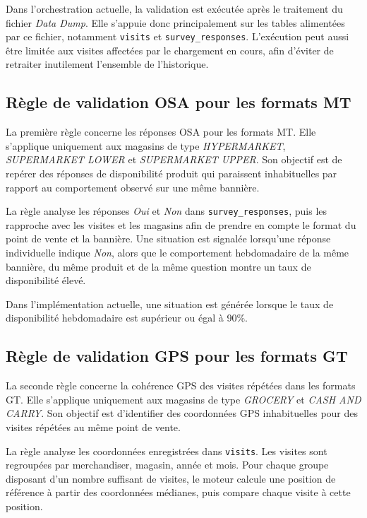 Dans l’orchestration actuelle, la validation est exécutée après le traitement du fichier \textit{Data Dump}. Elle s’appuie donc principalement sur les tables alimentées par ce fichier, notamment \texttt{visits} et \texttt{survey\_responses}. L’exécution peut aussi être limitée aux visites affectées par le chargement en cours, afin d’éviter de retraiter inutilement l’ensemble de l’historique.

\subsection{Règle de validation OSA pour les formats MT}

La première règle concerne les réponses OSA pour les formats MT. Elle s’applique uniquement aux magasins de type \textit{HYPERMARKET}, \textit{SUPERMARKET LOWER} et \textit{SUPERMARKET UPPER}. Son objectif est de repérer des réponses de disponibilité produit qui paraissent inhabituelles par rapport au comportement observé sur une même bannière.

La règle analyse les réponses \textit{Oui} et \textit{Non} dans \texttt{survey\_responses}, puis les rapproche avec les visites et les magasins afin de prendre en compte le format du point de vente et la bannière. Une situation est signalée lorsqu’une réponse individuelle indique \textit{Non}, alors que le comportement hebdomadaire de la même bannière, du même produit et de la même question montre un taux de disponibilité élevé.

Dans l’implémentation actuelle, une situation est générée lorsque le taux de disponibilité hebdomadaire est supérieur ou égal à 90\%.

\subsection{Règle de validation GPS pour les formats GT}

La seconde règle concerne la cohérence GPS des visites répétées dans les formats GT. Elle s’applique uniquement aux magasins de type \textit{GROCERY} et \textit{CASH AND CARRY}. Son objectif est d’identifier des coordonnées GPS inhabituelles pour des visites répétées au même point de vente.

La règle analyse les coordonnées enregistrées dans \texttt{visits}. Les visites sont regroupées par merchandiser, magasin, année et mois. Pour chaque groupe disposant d’un nombre suffisant de visites, le moteur calcule une position de référence à partir des coordonnées médianes, puis compare chaque visite à cette position.

